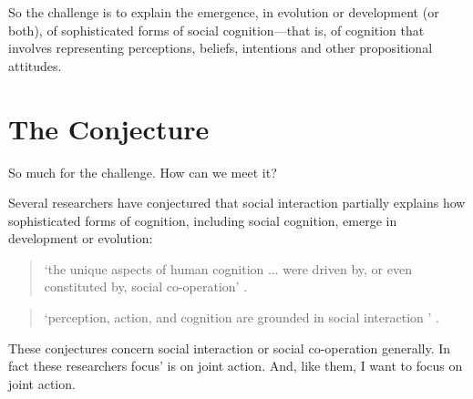 \documentclass[12pt,a4paper]{extarticle}
\begin{document}
So the challenge is to explain the emergence, in evolution or development (or both), of sophisticated forms of social cognition---that is, of cognition that involves representing  perceptions, beliefs, intentions and other propositional attitudes.






\section{The Conjecture}
So much for the challenge.
How can we meet it?

Several researchers have conjectured that social interaction partially explains how sophisticated forms of cognition, including social cognition, emerge in development or evolution:
%
\begin{quote} 
`the unique aspects of human cognition ... were driven by, or even constituted by, social co-operation'
\citep[p.\ 1]{Moll:2007gu}.
\end{quote}
%
\begin{quote} 
`perception, action, and cognition are grounded in social interaction%
' \citep[p.\ 103]{Knoblich:2006bn}.
\end{quote}
%
These conjectures concern social interaction or social co-operation generally.
In fact these researchers focus' is on joint action.
And, like them, I want to focus on joint action.
\end{document}
